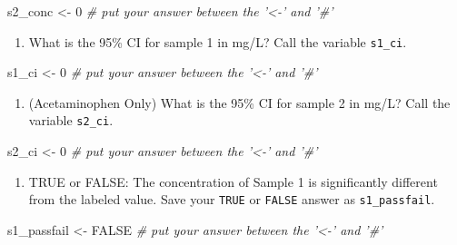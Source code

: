 \documentclass[]{tufte-book}
\newenvironment{Shaded}{}{}
\newcommand{\CommentTok}[1]{\textcolor[rgb]{0.38,0.63,0.69}{\textit{#1}}}
\newcommand{\DecValTok}[1]{\textcolor[rgb]{0.25,0.63,0.44}{#1}}
\newcommand{\NormalTok}[1]{#1}
\newcommand{\OtherTok}[1]{\textcolor[rgb]{0.00,0.44,0.13}{#1}}
\newcommand{\StringTok}[1]{\textcolor[rgb]{0.25,0.44,0.63}{#1}}
\providecommand{\tightlist}{%
  \setlength{\itemsep}{0pt}\setlength{\parskip}{0pt}}
\begin{document}
\begin{Shaded}
\begin{Highlighting}[]
\NormalTok{s2_conc <-}\StringTok{ }\DecValTok{0}     \CommentTok{# put your answer between the '<-' and '#'}
\end{Highlighting}
\end{Shaded}

\begin{enumerate}
\def\labelenumi{\arabic{enumi}.}
\setcounter{enumi}{7}
\tightlist
\item
  What is the 95\% CI for sample 1 in mg/L? Call the variable \texttt{s1\_ci}.
\end{enumerate}

\begin{Shaded}
\begin{Highlighting}[]
\NormalTok{s1_ci <-}\StringTok{ }\DecValTok{0}     \CommentTok{# put your answer between the '<-' and '#'}
\end{Highlighting}
\end{Shaded}

\begin{enumerate}
\def\labelenumi{\arabic{enumi}.}
\setcounter{enumi}{8}
\tightlist
\item
  (Acetaminophen Only) What is the 95\% CI for sample 2 in mg/L? Call the variable \texttt{s2\_ci}.
\end{enumerate}

\begin{Shaded}
\begin{Highlighting}[]
\NormalTok{s2_ci <-}\StringTok{ }\DecValTok{0}     \CommentTok{# put your answer between the '<-' and '#'}
\end{Highlighting}
\end{Shaded}

\begin{enumerate}
\def\labelenumi{\arabic{enumi}.}
\setcounter{enumi}{9}
\tightlist
\item
  TRUE or FALSE: The concentration of Sample 1 is significantly different from the labeled value. Save your \texttt{TRUE} or \texttt{FALSE} answer as \texttt{s1\_passfail}.
\end{enumerate}

\begin{Shaded}
\begin{Highlighting}[]
\NormalTok{s1_passfail <-}\StringTok{ }\OtherTok{FALSE}     \CommentTok{# put your answer between the '<-' and '#'}
\end{Highlighting}
\end{Shaded}
\end{document}
